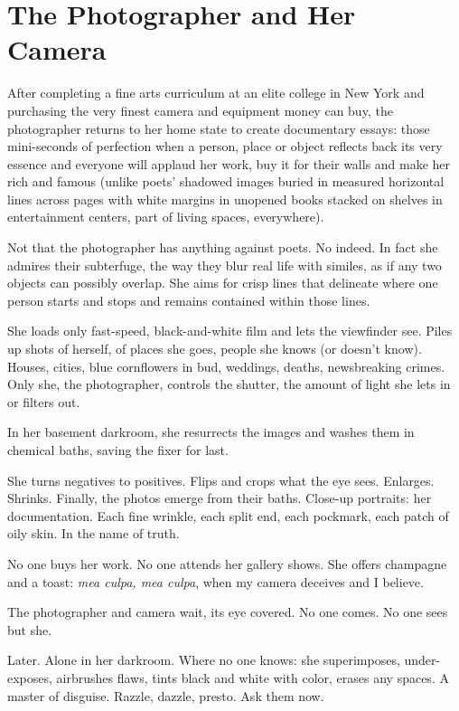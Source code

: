 \documentclass[twoside,10pt]{book}
\begin{document}
\clearpage
\section{The Photographer and Her Camera}

After completing a fine arts curriculum at an elite college in New York
and purchasing the very finest camera and equipment money can buy, the
photographer returns to her home state to create documentary essays:
those mini-seconds of perfection when a person, place or object reflects
back its very essence and everyone will applaud her work, buy it for
their walls and make her rich and famous (unlike poets' shadowed images
buried in measured horizontal lines across pages with white margins in
unopened books stacked on shelves in entertainment centers, part of
living spaces, everywhere).

Not that the photographer has anything against poets. No indeed. In fact
she admires their subterfuge, the way they blur real life with similes,
as if any two objects can possibly overlap. She aims for crisp lines
that delineate where one person starts and stops and remains contained
within those lines.

She loads only fast-speed, black-and-white film and lets the viewfinder
see. Piles up shots of herself, of places she goes, people she knows (or
doesn't know). Houses, cities, blue cornflowers in bud, weddings,
deaths, newsbreaking crimes. Only she, the photographer, controls the
shutter, the amount of light she lets in or filters out.

In her basement darkroom, she resurrects the images and washes them in
chemical baths, saving the fixer for last.

She turns negatives to positives. Flips and crops what the eye sees.
Enlarges. Shrinks. Finally, the photos emerge from their baths. Close-up
portraits: her documentation. Each fine wrinkle, each split end, each
pockmark, each patch of oily skin. In the name of truth.

No one buys her work. No one attends her gallery shows. She offers
champagne and a toast: \emph{mea culpa, mea culpa}, when my camera
deceives and I believe.

The photographer and camera wait, its eye covered. No one comes. No one
sees but she.

Later. Alone in her darkroom. Where no one knows: she superimposes,
under-exposes, airbrushes flaws, tints black and white with color,
erases any spaces. A master of disguise. Razzle, dazzle, presto. Ask
them now.
\end{document}
